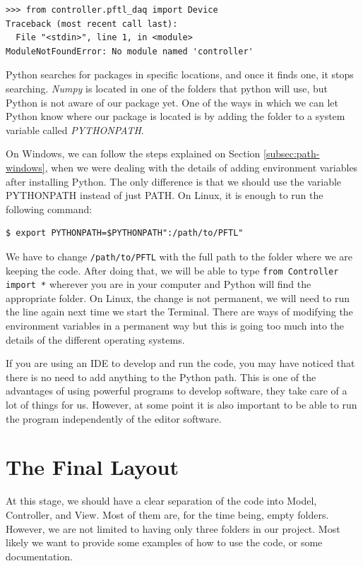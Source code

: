\begin{verbatim}
>>> from controller.pftl_daq import Device
Traceback (most recent call last):
  File "<stdin>", line 1, in <module>
ModuleNotFoundError: No module named 'controller'
\end{verbatim}

Python searches for packages in specific locations, and once it finds one, it stops searching. \emph{Numpy} is located in one of the folders that python will use, but Python is not aware of our package yet. One of the ways in which we can let Python know where our package is located is by adding the folder to a system variable called \emph{PYTHONPATH}.

On Windows, we can follow the steps explained on Section \ref{subsec:path-windows}, when we were dealing with the details of adding environment variables after installing Python. The only difference is that we should use the variable PYTHONPATH instead of just PATH. On Linux, it is enough to run the following command:

\begin{verbatim}
$ export PYTHONPATH=$PYTHONPATH":/path/to/PFTL"
\end{verbatim}

We have to change \texttt{/path/to/PFTL} with the full path to the folder where we are keeping the code. After doing that, we will be able to type \texttt{from Controller import *} wherever you are in your computer and Python will find the appropriate folder. On Linux, the change is not permanent, we will need to run the line again next time we start the Terminal. There are ways of modifying the environment variables in a permanent way but this is going too much into the details of the different operating systems.

If you are using an IDE to develop and run the code, you may have noticed that there is no need to add anything to the Python path. This is one of the advantages of using powerful programs to develop software, they take care of a lot of things for us. However, at some point it is also important to be able to run the program independently of the editor software.

\section{The Final Layout}\label{section:final-layout}
At this stage, we should have a clear separation of the code into Model, Controller, and View. Most of them are, for the time being, empty folders. However, we are not limited to having only three folders in our project. Most likely we want to provide some examples of how to use the code, or some documentation.

